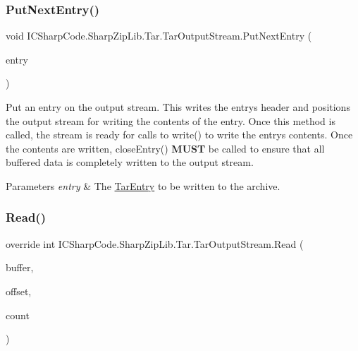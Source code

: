 \subsubsection{\texorpdfstring{Put\+Next\+Entry()}{PutNextEntry()}}
{\footnotesize\ttfamily void I\+C\+Sharp\+Code.\+Sharp\+Zip\+Lib.\+Tar.\+Tar\+Output\+Stream.\+Put\+Next\+Entry (\begin{DoxyParamCaption}\item[{\hyperlink{class_i_c_sharp_code_1_1_sharp_zip_lib_1_1_tar_1_1_tar_entry}{Tar\+Entry}}]{entry }\end{DoxyParamCaption})\hspace{0.3cm}{\ttfamily [inline]}}



Put an entry on the output stream. This writes the entry\textquotesingle{}s header and positions the output stream for writing the contents of the entry. Once this method is called, the stream is ready for calls to write() to write the entry\textquotesingle{}s contents. Once the contents are written, close\+Entry() {\bfseries M\+U\+ST} be called to ensure that all buffered data is completely written to the output stream. 


\begin{DoxyParams}{Parameters}
{\em entry} & The \hyperlink{class_i_c_sharp_code_1_1_sharp_zip_lib_1_1_tar_1_1_tar_entry}{Tar\+Entry} to be written to the archive. \\
\hline
\end{DoxyParams}
\mbox{\label{class_i_c_sharp_code_1_1_sharp_zip_lib_1_1_tar_1_1_tar_output_stream_a81ff99bd6bbb5900972616c0df73b62d}} 
\subsubsection{\texorpdfstring{Read()}{Read()}}
{\footnotesize\ttfamily override int I\+C\+Sharp\+Code.\+Sharp\+Zip\+Lib.\+Tar.\+Tar\+Output\+Stream.\+Read (\begin{DoxyParamCaption}\item[{byte \mbox{[}$\,$\mbox{]}}]{buffer,  }\item[{int}]{offset,  }\item[{int}]{count }\end{DoxyParamCaption})\hspace{0.3cm}{\ttfamily [inline]}}



